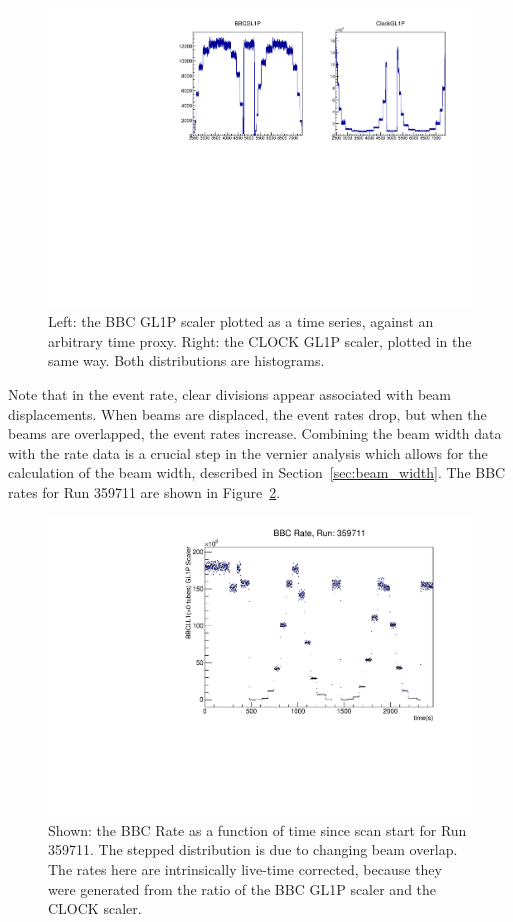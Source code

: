 \begin{figure}
  \centering
  \includegraphics[width=0.8\linewidth]{./figures/bbc_gl1_scalers.pdf}
  \caption{
    Left: the BBC GL1P scaler plotted as a time series, against an arbitrary
    time proxy. Right: the CLOCK GL1P scaler, plotted in the same way. Both
    distributions are histograms. 
  }
  \label{fig:bbc_gl1_scaler}
\end{figure}

Note that in the event rate, clear divisions appear associated with beam
displacements. When beams are displaced, the event rates drop, but when the
beams are overlapped, the event rates increase. Combining the beam width data
with the rate data is a crucial step in the vernier analysis which allows for
the calculation of the beam width, described in Section~\ref{sec:beam_width}.
The BBC rates for Run 359711 are shown in Figure~\ref{fig:bbc_rate_359711}.

\begin{figure}
  \centering
  \includegraphics[width=0.8\linewidth]{./figures/bbc_rate_359711.pdf}
  \caption{
    Shown: the BBC Rate as a function of time since scan start for Run 359711.
    The stepped distribution is due to changing beam overlap. The rates here are
    intrinsically live-time corrected, because they were generated from the
    ratio of the BBC GL1P scaler and the CLOCK scaler.
  }
  \label{fig:bbc_rate_359711}
\end{figure}

